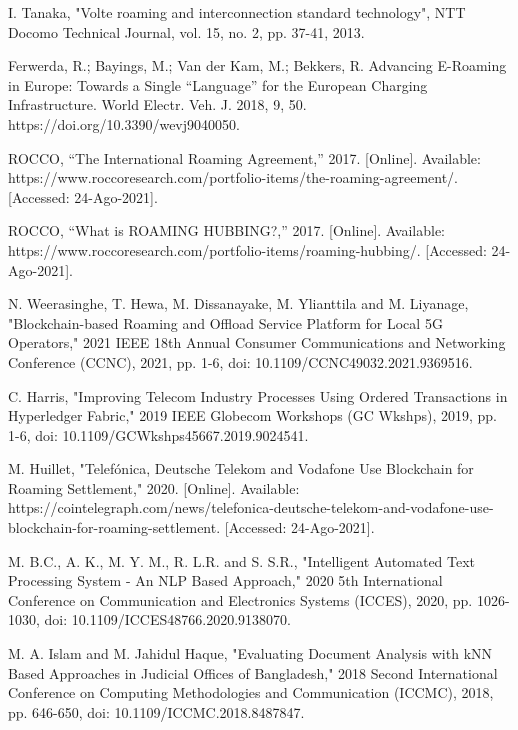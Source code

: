 \documentclass[conference]{style/IEEEtran}
\begin{document}


\begin{thebibliography}{00}

 I. Tanaka, "Volte roaming and interconnection standard technology", NTT Docomo Technical Journal, vol. 15, no. 2, pp. 37-41, 2013.

 Ferwerda, R.; Bayings, M.; Van der Kam, M.; Bekkers, R. Advancing E-Roaming in Europe: Towards a Single “Language” for the European Charging Infrastructure. World Electr. Veh. J. 2018, 9, 50. https://doi.org/10.3390/wevj9040050.

 ROCCO, “The International Roaming Agreement,” 2017. [Online]. Available: https://www.roccoresearch.com/portfolio-items/the-roaming-agreement/. [Accessed: 24-Ago-2021].

 ROCCO, “What is ROAMING HUBBING?,” 2017. [Online]. Available: https://www.roccoresearch.com/portfolio-items/roaming-hubbing/. [Accessed: 24-Ago-2021].

 N. Weerasinghe, T. Hewa, M. Dissanayake, M. Ylianttila and M. Liyanage, "Blockchain-based Roaming and Offload Service Platform for Local 5G Operators," 2021 IEEE 18th Annual Consumer Communications and Networking Conference (CCNC), 2021, pp. 1-6, doi: 10.1109/CCNC49032.2021.9369516.

 C. Harris, "Improving Telecom Industry Processes Using Ordered Transactions in Hyperledger Fabric," 2019 IEEE Globecom Workshops (GC Wkshps), 2019, pp. 1-6, doi: 10.1109/GCWkshps45667.2019.9024541.

 M. Huillet, "Telefónica, Deutsche Telekom and Vodafone Use Blockchain for Roaming Settlement," 2020. [Online]. Available: https://cointelegraph.com/news/telefonica-deutsche-telekom-and-vodafone-use-blockchain-for-roaming-settlement. [Accessed: 24-Ago-2021].

 M. B.C., A. K., M. Y. M., R. L.R. and S. S.R., "Intelligent Automated Text Processing System - An NLP Based Approach," 2020 5th International Conference on Communication and Electronics Systems (ICCES), 2020, pp. 1026-1030, doi: 10.1109/ICCES48766.2020.9138070.

 M. A. Islam and M. Jahidul Haque, "Evaluating Document Analysis with kNN Based Approaches in Judicial Offices of Bangladesh," 2018 Second International Conference on Computing Methodologies and Communication (ICCMC), 2018, pp. 646-650, doi: 10.1109/ICCMC.2018.8487847.


\end{thebibliography}
\end{document}
